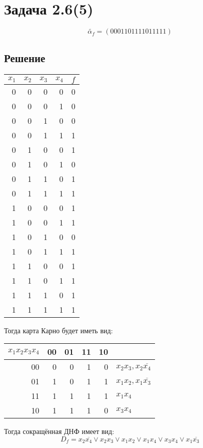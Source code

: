\documentclass[11pt]{article}
\begin{document}
\section{Задача 2.6(5)}
\label{sec:orgfc1c3b3}
  \begin{equation}
\tilde{\alpha_f} = (0001 1011 1101 1111)
  \end{equation}
\subsection{Решение}
\label{sec:org8659f20}
\begin{center}
\begin{tabular}{rrrrr}
\hline
\(x_1\) & \(x_2\) & \(x_3\) & \(x_4\) & \(f\)\\
\hline
0 & 0 & 0 & 0 & 0\\
0 & 0 & 0 & 1 & 0\\
0 & 0 & 1 & 0 & 0\\
0 & 0 & 1 & 1 & 1\\
0 & 1 & 0 & 0 & 1\\
0 & 1 & 0 & 1 & 0\\
0 & 1 & 1 & 0 & 1\\
0 & 1 & 1 & 1 & 1\\
1 & 0 & 0 & 0 & 1\\
1 & 0 & 0 & 1 & 1\\
1 & 0 & 1 & 0 & 0\\
1 & 0 & 1 & 1 & 1\\
1 & 1 & 0 & 0 & 1\\
1 & 1 & 0 & 1 & 1\\
1 & 1 & 1 & 0 & 1\\
1 & 1 & 1 & 1 & 1\\
\hline
\end{tabular}
\end{center}
Тогда карта Карно будет иметь вид:
\begin{center}
\begin{tabular}{rrrrrl}
\hline
\(x_1x_2x_3x_4\) & 00 & 01 & 11 & 10 & \\
\hline
00 & 0 & 0 & 1 & 0 & \(x_2x_3, x_2\overline{x_4}\)\\
01 & 1 & 0 & 1 & 1 & \(x_1x_2, x_1\overline{x_3}\)\\
11 & 1 & 1 & 1 & 1 & \(x_1x_4\)\\
10 & 1 & 1 & 1 & 0 & \(x_3x_4\)\\
\hline
\end{tabular}
\end{center}
Тогда сокращённая ДНФ имеет вид:
\begin{equation}
D_f = x_2\overline{x_4}\vee x_2x_3\vee x_1x_2\vee x_1x_4\vee x_3x_4\vee x_1\overline{x_3}
\end{equation}
\end{document}
